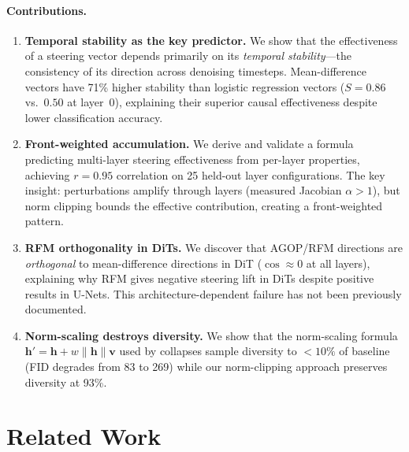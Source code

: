 \documentclass{article}
\theoremstyle{definition}
\newcommand{\bv}{\mathbf{v}}
\newcommand{\bh}{\mathbf{h}}
\begin{document}
\paragraph{Contributions.}
\begin{enumerate}[leftmargin=*,nosep]
  \item \textbf{Temporal stability as the key predictor.} We show that the effectiveness of a steering vector depends primarily on its \emph{temporal stability}---the consistency of its direction across denoising timesteps. Mean-difference vectors have 71\% higher stability than logistic regression vectors ($S = 0.86$ vs.\ $0.50$ at layer~0), explaining their superior causal effectiveness despite lower classification accuracy.

  \item \textbf{Front-weighted accumulation.} We derive and validate a formula predicting multi-layer steering effectiveness from per-layer properties, achieving $r = 0.95$ correlation on 25 held-out layer configurations. The key insight: perturbations amplify through layers (measured Jacobian $\alpha > 1$), but norm clipping bounds the effective contribution, creating a front-weighted pattern.

  \item \textbf{RFM orthogonality in DiTs.} We discover that AGOP/RFM directions are \emph{orthogonal} to mean-difference directions in DiT ($\cos \approx 0$ at all layers), explaining why RFM gives negative steering lift in DiTs despite positive results in U-Nets. This architecture-dependent failure has not been previously documented.

  \item \textbf{Norm-scaling destroys diversity.} We show that the norm-scaling formula $\bh' = \bh + w \|\bh\| \bv$ used by \citet{wang2026general} collapses sample diversity to $<10\%$ of baseline (FID degrades from 83 to 269) while our norm-clipping approach preserves diversity at 93\%.
\end{enumerate}

\section{Related Work}
\label{sec:related}
\end{document}

